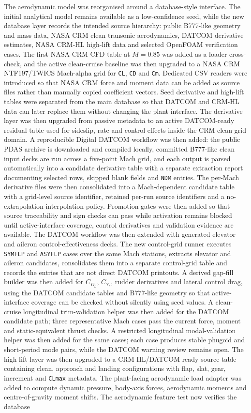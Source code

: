 The aerodynamic model was reorganised around a database-style interface. The initial analytical model remains available as a low-confidence seed, while the new database layer records the intended source hierarchy: public B777-like geometry and mass data, NASA CRM clean transonic aerodynamics, DATCOM derivative estimates, NASA CRM-HL high-lift data and selected OpenFOAM verification cases. The first NASA CRM CFD table at $M=0.85$ was added as a loader cross-check, and the active clean-cruise baseline was then upgraded to a NASA CRM NTF197/TWICS Mach-alpha grid for \texttt{CL}, \texttt{CD} and \texttt{Cm}. Dedicated CSV readers were introduced so that NASA CRM force and moment data can be added as source files rather than manually copied coefficient vectors. Seed derivative and high-lift tables were separated from the main database so that DATCOM and CRM-HL data can later replace them without changing the plant interface. The derivative layer was then upgraded from passive metadata to an active DATCOM-ready residual table used for sideslip, rate and control effects inside the CRM clean-grid domain. A reproducible Digital DATCOM workflow was then added: the public PDAS archive is downloaded and compiled locally, committed B777-like clean input decks are run across a five-point Mach grid, and each output is parsed automatically into a candidate derivative table with a separate extraction report documenting selected rows, skipped blank fields and \texttt{NDM} entries. The per-Mach derivative files were then consolidated into a Mach-dependent candidate table with a grid-level source identifier, retained per-run source identifiers and a no-extrapolation interpolation policy. Promotion gates were then added so that source traceability and sign checks can pass while activation remains blocked until active-interface coverage, control derivatives and validation evidence are available. The DATCOM workflow was then extended with generated elevator and aileron control-effectiveness decks. The new control-grid runner executes \texttt{SYMFLP} and \texttt{ASYFLP} cases over the same Mach stations, extracts elevator and aileron candidates, consolidates them into a separate control-grid table and records the entries that are not direct DATCOM printouts. A derived gap-fill builder was then added for $C_{D_\beta}$, $C_{Y_r}$, rudder derivatives and lateral control drag, using the DATCOM candidate tables and B777-like geometry so that active-interface coverage can be checked without silently using seed values. A clean-cruise longitudinal trim-validation helper was then added for the DATCOM candidate path; three representative Mach cases pass the current force, moment and static-equivalent thrust checks. A restricted longitudinal modal-validation helper was then added for the same cases; each case produces stable phugoid and short-period mode pairs, while the DATCOM warning review remains open. The high-lift layer was then upgraded to a CRM-HL/DATCOM-ready source table containing clean, approach and landing configurations with flap, slat, gear, increment and \texttt{CLmax} metadata. The plant-facing aerodynamic load adapter was added to compute dynamic pressure, body-axis forces, aerodynamic moments and centre-of-gravity moment shifts. The aerodynamic feature test now verifies the database 